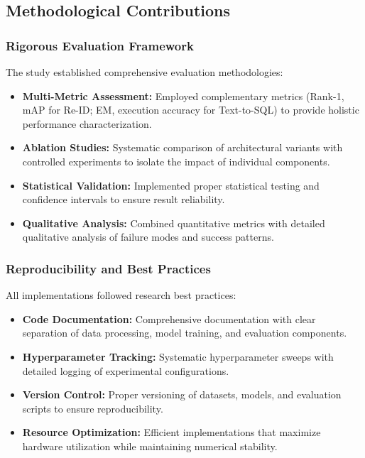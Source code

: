 \documentclass[a4paper,12pt]{article}
\begin{document}
\subsection{Methodological Contributions}

\subsubsection*{Rigorous Evaluation Framework}
The study established comprehensive evaluation methodologies:

\begin{itemize}
    \item \textbf{Multi-Metric Assessment:} Employed complementary metrics (Rank-1, mAP for Re-ID; EM, execution accuracy for Text-to-SQL) to provide holistic performance characterization.
    \item \textbf{Ablation Studies:} Systematic comparison of architectural variants with controlled experiments to isolate the impact of individual components.
    \item \textbf{Statistical Validation:} Implemented proper statistical testing and confidence intervals to ensure result reliability.
    \item \textbf{Qualitative Analysis:} Combined quantitative metrics with detailed qualitative analysis of failure modes and success patterns.
\end{itemize}

\subsubsection*{Reproducibility and Best Practices}
All implementations followed research best practices:

\begin{itemize}
    \item \textbf{Code Documentation:} Comprehensive documentation with clear separation of data processing, model training, and evaluation components.
    \item \textbf{Hyperparameter Tracking:} Systematic hyperparameter sweeps with detailed logging of experimental configurations.
    \item \textbf{Version Control:} Proper versioning of datasets, models, and evaluation scripts to ensure reproducibility.
    \item \textbf{Resource Optimization:} Efficient implementations that maximize hardware utilization while maintaining numerical stability.
\end{itemize}
\end{document}
